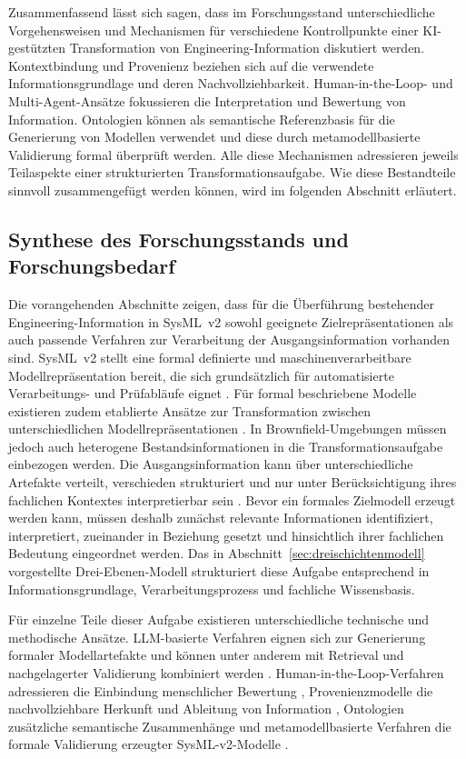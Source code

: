 Zusammenfassend lässt sich sagen, dass im Forschungsstand unterschiedliche
Vorgehensweisen und Mechanismen für verschiedene Kontrollpunkte einer
KI-gestützten Transformation von Engineering-Information diskutiert werden.
Kontextbindung und Provenienz beziehen sich auf die verwendete
Informationsgrundlage und deren Nachvollziehbarkeit.
Human-in-the-Loop- und Multi-Agent-Ansätze fokussieren die Interpretation und
Bewertung von Information. Ontologien können als semantische Referenzbasis
für die Generierung von Modellen verwendet und diese durch
metamodellbasierte Validierung formal überprüft werden. Alle diese
Mechanismen adressieren jeweils Teilaspekte einer strukturierten
Transformationsaufgabe. Wie diese Bestandteile sinnvoll zusammengefügt werden
können, wird im folgenden Abschnitt erläutert.

\subsection{Synthese des Forschungsstands und Forschungsbedarf}
\label{sec:forschungsbedarf}

Die vorangehenden Abschnitte zeigen, dass für die Überführung bestehender
Engineering-Information in SysML~v2 sowohl geeignete Zielrepräsentationen als
auch passende Verfahren zur Verarbeitung der Ausgangsinformation vorhanden
sind. SysML~v2 stellt eine formal definierte und maschinenverarbeitbare
Modellrepräsentation bereit, die sich grundsätzlich für automatisierte
Verarbeitungs- und Prüfabläufe eignet \cite{SysMLv2,Teodorov2025}. Für formal
beschriebene Modelle existieren zudem etablierte Ansätze zur Transformation
zwischen unterschiedlichen Modellrepräsentationen
\cite{Kapos.2014,Li.2022,Zhou.2024}.
\newpage
In Brownfield-Umgebungen müssen jedoch auch heterogene Bestandsinformationen
in die Transformationsaufgabe einbezogen werden. Die Ausgangsinformation kann
über unterschiedliche Artefakte verteilt, verschieden strukturiert und nur
unter Berücksichtigung ihres fachlichen Kontextes interpretierbar sein
\cite{Maheshwari2018,Henderson2024,Legat2014}. Bevor ein formales Zielmodell
erzeugt werden kann, müssen deshalb zunächst relevante Informationen
identifiziert, interpretiert, zueinander in Beziehung gesetzt und
hinsichtlich ihrer fachlichen Bedeutung eingeordnet werden. Das in
Abschnitt~\ref{sec:dreischichtenmodell} vorgestellte Drei-Ebenen-Modell
strukturiert diese Aufgabe entsprechend in Informationsgrundlage,
Verarbeitungsprozess und fachliche Wissensbasis.

Für einzelne Teile dieser Aufgabe existieren unterschiedliche technische und
methodische Ansätze. LLM-basierte Verfahren eignen sich zur Generierung
formaler Modellartefakte und können unter anderem mit Retrieval und
nachgelagerter Validierung kombiniert werden
\cite{Pan.2025,Cibrian.2025,Stein2026}. Human-in-the-Loop-Verfahren
adressieren die Einbindung menschlicher Bewertung
\cite{MosqueiraRey2023}, Provenienzmodelle die nachvollziehbare Herkunft und
Ableitung von Information \cite{MoreauMissier2013}, Ontologien zusätzliche
semantische Zusammenhänge \cite{OrellanaMandrick2019,Lu2022} und
metamodellbasierte Verfahren die formale Validierung erzeugter
SysML-v2-Modelle \cite{Cibrian.2025b}.

